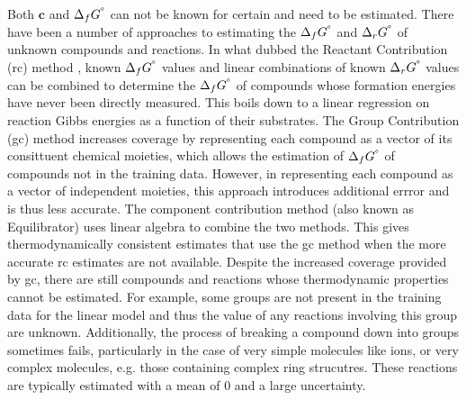 \documentclass[10pt,letterpaper]{article}
\newcommand{\sdgf}{\Delta_fG^{\degree}}
\newcommand{\sdgr}{\Delta_rG^{\degree}}
\begin{document}
Both $\mathbf{c}$ and $\sdgf$ can not be known for certain and need to be estimated.
There have been a number of approaches to estimating the $\sdgf$ and $\sdgr$ of unknown compounds and reactions.
In what \citet{noor_2013_equilibrator} dubbed the Reactant Contribution (rc) method \cite{ALBERTY_1998_thermo_data}, known $\sdgf$ values and linear combinations of known $\sdgr$ values can be combined to determine the $\sdgf$ of compounds whose formation energies have never been directly measured.
This boils down to a linear regression on reaction Gibbs energies as a function of their substrates.
The Group Contribution (gc) method \cite{JANKOWSKI_2008_group_contribution, Mavrovouniotis_1990_group_contribtuion} increases coverage by representing each compound as a vector of its consittuent chemical moieties, which allows the estimation of $\sdgf$ of compounds not in the training data.
However, in representing each compound as a vector of independent moieties, this approach introduces additional errror and is thus less accurate.
The component contribution method (also known as Equilibrator) \cite{noor_2013_equilibrator} uses linear algebra to combine the two methods.
This gives thermodynamically consistent estimates that use the gc method when the more accurate rc estimates are not available.
Despite the increased coverage provided by gc, there are still compounds and reactions whose thermodynamic properties cannot be estimated.
For example, some groups are not present in the training data for the linear model and thus the value of any reactions involving this group are unknown.
Additionally, the process of breaking a compound down into groups sometimes fails, particularly in the case of very simple molecules like ions, or very complex molecules, e.g. those containing complex ring strucutres.
These reactions are typically estimated with a mean of 0 and a large uncertainty.
\end{document}
